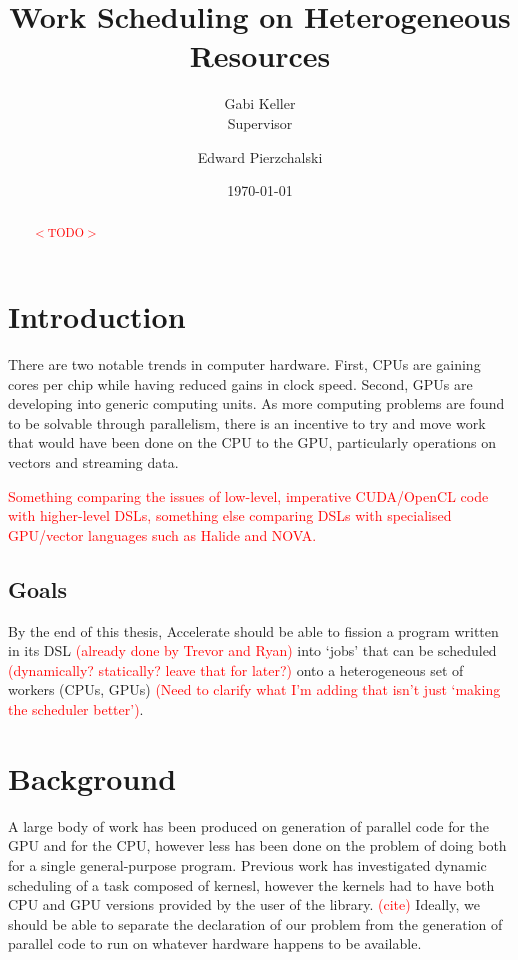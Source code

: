 \documentclass[a4paper,12pt]{article}
\title{Work Scheduling on Heterogeneous Resources}
\date{\today}
\author{Gabi Keller\\\small{Supervisor} \and Edward Pierzchalski}
\newcommand{\red}[1]{\textcolor{red}{#1}}
\begin{document}
\maketitle

\begin{multicols*}{2}

\begin{abstract}
\red{$<$TODO$>$}
\end{abstract}

\section{Introduction}

There are two notable trends in computer hardware. First, CPUs are gaining cores per chip while having reduced gains in clock speed. Second, GPUs are developing into generic computing units. As more computing problems are found to be solvable through parallelism, there is an incentive to try and move work that would have been done on the CPU to the GPU, particularly operations on vectors and streaming data.

\red{Something comparing the issues of low-level, imperative CUDA/OpenCL code with higher-level DSLs, something else comparing DSLs with specialised GPU/vector languages such as Halide and NOVA.}


\subsection{Goals}

By the end of this thesis, Accelerate should be able to fission a program written in its DSL \red{(already done by Trevor and Ryan)} into `jobs' that can be scheduled \red{(dynamically? statically? leave that for later?)} onto a heterogeneous set of workers (CPUs, GPUs) \red{(Need to clarify what I'm adding that isn't just `making the scheduler better')}.


\section{Background}

A large body of work has been produced on generation of parallel code for the GPU and for the CPU, however less has been done on the problem of doing both for a single general-purpose program. Previous work has investigated dynamic scheduling of a task composed of kernesl, however the kernels had to have both CPU and GPU versions provided by the user of the library. \red{(cite)} Ideally, we should be able to separate the declaration of our problem from the generation of parallel code to run on whatever hardware happens to be available.


\end{multicols*}
\end{document}
